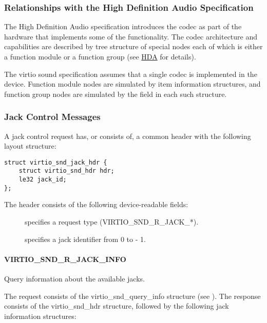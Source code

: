 \subsubsection{Relationships with the High Definition Audio Specification}\label{sec:Device Types / Sound Device / Device Operation / Relationships with HDA}

The High Definition Audio specification introduces the codec as part of the
hardware that implements some of the functionality. The codec architecture and
capabilities are described by tree structure of special nodes each of which is
either a function module or a function group (see \hyperref[intro:HDA]{HDA} for
details).

The virtio sound specification assumes that a single codec is implemented in the
device. Function module nodes are simulated by item information structures,
and function group nodes are simulated by the  field in each
such structure.

\subsubsection{Jack Control Messages}\label{sec:Device Types / Sound Device / Device Operation / Jack Control Messages}

A jack control request has, or consists of, a common header with the following
layout structure:

\begin{lstlisting}
struct virtio_snd_jack_hdr {
    struct virtio_snd_hdr hdr;
    le32 jack_id;
};
\end{lstlisting}

The header consists of the following device-readable fields:

\begin{description}
\item[] specifies a request type (VIRTIO_SND_R_JACK_*).
\item[] specifies a jack identifier from 0 to  - 1.
\end{description}

\paragraph{VIRTIO_SND_R_JACK_INFO}

Query information about the available jacks.

The request consists of the virtio_snd_query_info structure
(see ).
The response consists of the virtio_snd_hdr structure, followed by the following
jack information structures:

